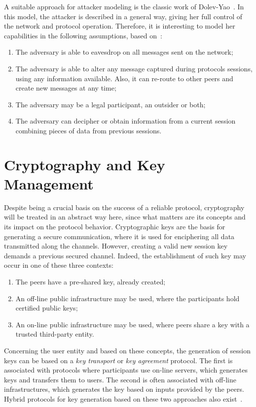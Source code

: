A suitable approach for attacker modeling is the classic work of Dolev-Yao~\cite{DolevYao81}. In this model, the attacker is described in a general way, giving her full control of the network and protocol operation. Therefore, it is interesting to model her capabilities in the following assumptions, based on~\cite{BoydMathuria2008}:

\begin{enumerate}
  \item The adversary is able to eavesdrop on all messages sent on the network;
  \item The adversary is able to alter any message captured during protocols sessions, using any information available. Also, it can re-route to other peers and create new messages at any time;
  \item The adversary may be a legal participant, an outsider or both;
  \item The adversary can decipher or obtain information from a current session combining pieces of data from previous sessions.
\end{enumerate}





\section{Cryptography and Key Management}
Despite being a crucial basis on the success of a reliable protocol, cryptography will be treated in an abstract way here, since what matters are its concepts and its impact on the protocol behavior. Cryptographic keys are the basis for generating a secure communication, where it is used for enciphering all data transmitted along the channels. However, creating a valid new session key demands a previous secured channel. Indeed, the establishment of such key may occur in one of these three contexts:

\begin{enumerate}
  \item The peers have a pre-shared key, already created;
  \item An off-line public infrastructure may be used, where the participants hold certified public keys;
  \item An on-line public infrastructure may be used, where peers share a key with a trusted third-party entity.
\end{enumerate}

Concerning the user entity and based on these concepts, the generation of session keys can be based on a \textit{key transport} or \textit{key agreement} protocol. The first is associated with protocols where participants use on-line servers, which generates keys and transfers them to users. The second is often associated with off-line infrastructures, which generates the key based on inputs provided by the peers. Hybrid protocols for key generation based on these two approaches also exist~\cite{BoydMathuria2008}.





